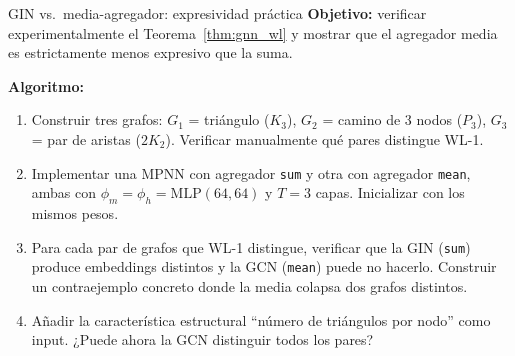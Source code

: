 \begin{ejerciciocomp}{GIN vs.\ media-agregador: expresividad práctica}
\textbf{Objetivo:} verificar experimentalmente el Teorema~\ref{thm:gnn_wl}
y mostrar que el agregador media es estrictamente menos expresivo que la suma.

\medskip\noindent\textbf{Algoritmo:}
\begin{enumerate}
  \item Construir tres grafos: $G_1$ = triángulo ($K_3$), $G_2$ = camino
        de 3 nodos ($P_3$), $G_3$ = par de aristas ($2K_2$). Verificar
        manualmente qué pares distingue WL-1.
  \item Implementar una MPNN con agregador \texttt{sum} y otra con agregador
        \texttt{mean}, ambas con $\phi_m = \phi_h = \mathrm{MLP}(64, 64)$ y
        $T = 3$ capas. Inicializar con los mismos pesos.
  \item Para cada par de grafos que WL-1 distingue, verificar que la GIN
        (\texttt{sum}) produce embeddings distintos y la GCN (\texttt{mean})
        puede no hacerlo. Construir un contraejemplo concreto donde la media
        colapsa dos grafos distintos.
  \item Añadir la característica estructural ``número de triángulos por nodo''
        como input. ¿Puede ahora la GCN distinguir todos los pares?
\end{enumerate}
\end{ejerciciocomp}

